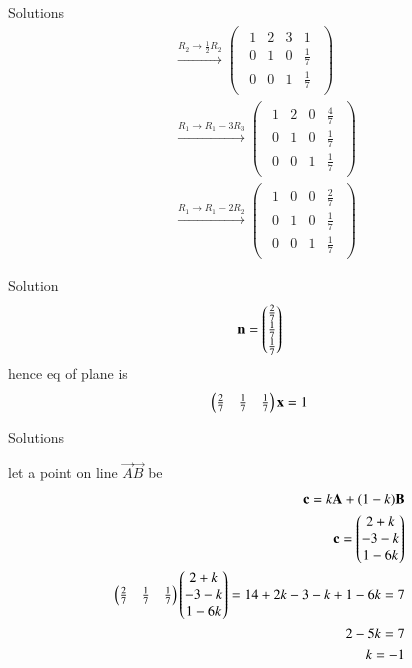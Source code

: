 \documentclass{beamer}
\begin{document}
\begin{frame}{Solutions}
    \begin{align}
  &\xrightarrow{R_2 \to \tfrac{1}{2}R_2}
\begin{pmatrix}
\begin{array}{ccc|c}
1 & 2 & 3 & 1\\
0 & 1 & 0 & \tfrac{1}{7}\\
0 & 0 & 1 & \tfrac{1}{7}
\end{array}
\end{pmatrix} \\[4pt]
&\xrightarrow{R_1 \to R_1 - 3R_3}
\begin{pmatrix}
\begin{array}{ccc|c}
1 & 2 & 0 & \tfrac{4}{7}\\
0 & 1 & 0 & \tfrac{1}{7}\\
0 & 0 & 1 & \tfrac{1}{7}
\end{array}
\end{pmatrix} \\[4pt]
&\xrightarrow{R_1 \to R_1 - 2R_2}
\begin{pmatrix}
\begin{array}{ccc|c}
1 & 0 & 0 & \tfrac{2}{7}\\
0 & 1 & 0 & \tfrac{1}{7}\\
0 & 0 & 1 & \tfrac{1}{7}
\end{array}
\end{pmatrix}  
\end{align}
\end{frame}
\begin{frame}{Solution}
    \begin{align}
\mathbf{n}=
\begin{pmatrix}\frac{2}{7}
       \\
       \frac{1}{7}
       \\
       \frac{1}{7}
\end{pmatrix}
\end{align}  
hence eq of plane is
\begin{align}
 \begin{pmatrix}\tfrac{2}{7} & \tfrac{1}{7} & \tfrac{1}{7}\end{pmatrix} 
 \mathbf{x}
 =1
\end{align}   
\end{frame}
\begin{frame}{Solutions}

    let a point on line $\vec{A}\vec{B}$ be 
\begin{align}
\mathbf{c}=k\mathbf{A}+(1-k)\mathbf{B}\\
\mathbf{c}=\begin{pmatrix}2+k
               \\
              -3-k
              \\
              1-6k
 \end{pmatrix}\\
\begin{pmatrix}\tfrac{2}{7} & \tfrac{1}{7} & \tfrac{1}{7}\end{pmatrix} 
\begin{pmatrix}2+k
               \\
              -3-k
              \\
              1-6k
              \end{pmatrix}
 =1
 4+2k-3-k+1-6k=7\\
2-5k=7\\
k=-1
\end{align}
\end{frame}
\end{document}
